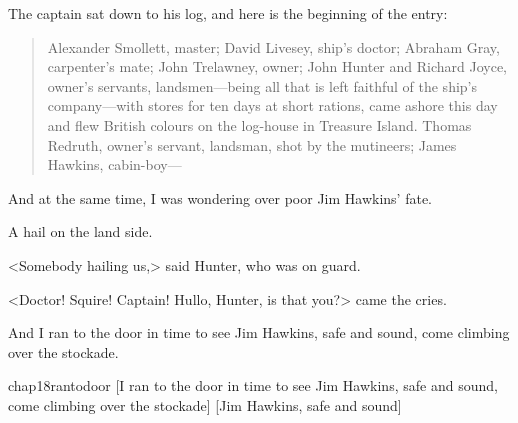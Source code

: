 The captain sat down to his log, and here is the beginning of the entry:
\begin{quote}
Alexander Smollett, master; David Livesey, ship's doctor; Abraham Gray, carpenter's mate; John Trelawney, owner; John Hunter and Richard Joyce, owner's servants, landsmen—being all that is left faithful of the ship's company—with stores for ten days at short rations, came ashore this day and flew British colours on the log-house in Treasure Island. Thomas Redruth, owner's servant, landsman, shot by the mutineers; James Hawkins, cabin-boy—
\end{quote}

And at the same time, I was wondering over poor Jim Hawkins' fate.

A hail on the land side.

<Somebody hailing us,> said Hunter, who was on guard.

<Doctor! Squire! Captain! Hullo, Hunter, is that you?> came the cries.

And I ran to the door in time to see Jim Hawkins, safe and sound, come climbing over the stockade.


\begin{bwbigpic}
	[\basicscale]
	{chap18rantodoor}
	[I ran to the door in time to see Jim Hawkins, safe and sound, come climbing over the stockade]
	[Jim Hawkins, safe and sound]
\end{bwbigpic}